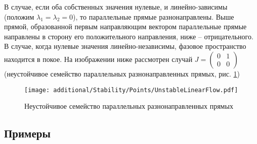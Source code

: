 \begin{enumerate}
			В случае, если оба собственных значения нулевые, и линейно-зависимы (положим $\lambda_1 = \lambda_2 = 0$), то параллельные прямые разнонаправлены. Выше прямой, образованной первым направляющим вектором параллельные прямые направлены в сторону его положительного направления, ниже -- отрицательного. В случае, когда нулевые значения линейно-независимы, фазовое пространство находится в покое. На изображении ниже рассмотрен случай $J = \begin{pmatrix} 0 & 1 \\ 0 & 0 \end{pmatrix}$ (неустойчивое семейство параллельных разнонаправленных прямых, рис. \ref{Stability:UnstableLinearFlow})
			
			\begin{figure}[H]
				\centering
				\texttt{[image: additional/Stability/Points/UnstableLinearFlow.pdf]}
				\caption{Неустойчивое семейство параллельных разнонаправленных прямых}
				\label{Stability:UnstableLinearFlow}
			\end{figure}

	\end{enumerate}


	\subsection{Примеры}

